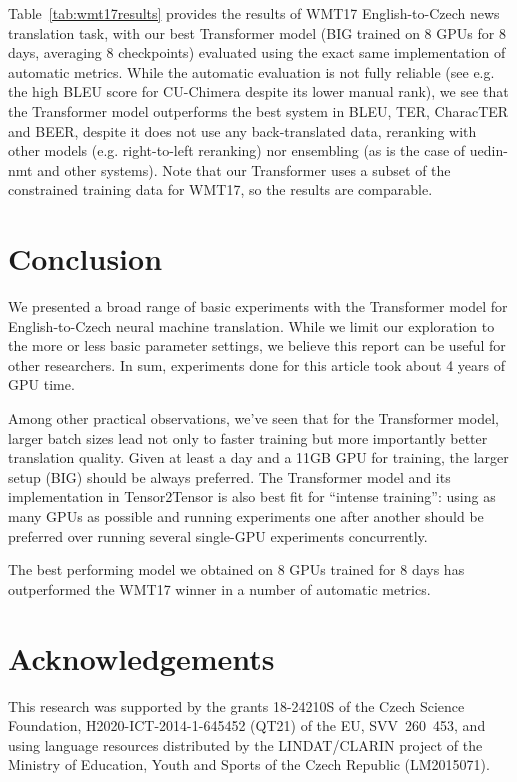 \documentclass{pbmlarxiv} \pdfoutput=1
\def\Tref#1{Table~\ref{#1}}
\def\parcite#1{\cite{#1}}
\begin{document}
\Tref{tab:wmt17results} provides the results of WMT17 English-to-Czech news translation task,
 with our best Transformer model (BIG trained on 8 GPUs for 8 days, averaging 8 checkpoints)
 evaluated using the exact same implementation of automatic metrics.
While the automatic evaluation is not fully reliable
 (see e.g. the high BLEU score for CU-Chimera despite its lower manual rank),
 we see that the Transformer model outperforms the best system in BLEU, TER, CharacTER and BEER,
 despite it does not use any back-translated data,
 reranking with other models (e.g. right-to-left reranking) nor ensembling (as is the case of uedin-nmt and other systems).
Note that our Transformer uses a subset of the constrained training data for WMT17,
 so the results are comparable.

\section{Conclusion}
\label{conclusion}

We presented a broad range of basic experiments with the Transformer model
\parcite{vaswani-et-al:2017} for English-to-Czech neural machine translation.
While we limit our exploration to the more or less basic parameter settings, we
believe this report can be useful for other researchers.
In sum, experiments done for this article took about 4 years of GPU time.

Among other practical observations, we've seen that for the Transformer model, larger batch sizes lead not only to
faster training but more importantly better translation quality.
Given at least a day and a 11GB GPU for training, the larger setup (BIG)
should be always preferred.
The Transformer model and its implementation in Tensor2Tensor is also best fit
for ``intense training'': using as many GPUs as possible and running experiments
one after another should be preferred over running several single-GPU experiments concurrently.

The best performing model we obtained on 8 GPUs trained for 8 days has outperformed the WMT17 winner in a number of automatic metrics.

\section*{Acknowledgements}
This research was supported by the grants
18-24210S of the Czech Science Foundation, %
H2020-ICT-2014-1-645452 (QT21) of the EU,
SVV~260~453, %
 and using language resources distributed by the LINDAT/CLARIN project of the
 Ministry of Education, Youth and Sports of the Czech Republic (LM2015071).



\correspondingaddress
\end{document}
